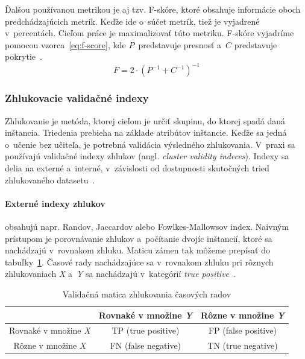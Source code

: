 \documentclass[a4paper,twoside,slovak,12pt,appendix]{article}
\begin{document}
Ďalšou používanou metrikou je aj tzv. F-skóre, ktoré obsahuje informácie oboch
predchádzajúcich metrík. Keďže ide o~súčet metrík, tiež je vyjadrené
v~percentách. Cieľom práce je maximalizovať túto metriku. F-skóre vyjadríme
pomocou vzorca~\ref{eq:f-score}, kde $P$~predstavuje presnosť a~$C$ predstavuje
pokrytie~\cite{Trevizan2015}.
\begin{equation}
	\label{eq:f-score}
  F = 2 \cdot \left( P^{-1} + C^{-1} \right)^{-1}
\end{equation}

\subsubsection{Zhlukovacie validačné indexy}
\label{c:cluster-validity-indeces}
Zhlukovanie je metóda, ktorej cieľom je určiť skupinu, do ktorej spadá daná
inštancia. Triedenia prebieha na základe atribútov inštancie. Keďže sa jedná
o~učenie bez učiteľa, je potrebná validácia výsledného zhlukovania. V~praxi sa
používajú validačné indexy zhlukov (angl. \textit{cluster validity indeces}).
Indexy sa delia na externé a~interné, v~závislosti od dostupnosti skutočných
tried zhlukovaného datasetu~\cite{Arbelaitz2013}.

\paragraph{Externé indexy zhlukov} obsahujú napr. Randov, Jaccardov alebo
Fowlkes-Mallowsov index. Naivným prístupom je porovnávanie zhlukov a~počítanie
dvojíc inštancií, ktoré sa nachádzajú v~rovnakom zhluku. Maticu zámen tak
môžeme prepísať do tabuľky~\ref{tab:validation-matrix}. Časové rady nachádzajúce
sa v~rovnakom zhluku pri rôznych zhlukovaniach \textit{X} a~\textit{Y} sa
nachádzajú v~kategórií \textit{true positive}~\cite{Bilgic2018}.

\begin{table}[htbp]
	\centering
	\caption{Validačná matica zhlukovania časových radov}
	\label{tab:validation-matrix}
	\begin{tabular}{|c|c|c|}
		\hline
		 																		&  Rovnaké v množine \textit{Y}   &  Rôzne v množine \textit{Y}   \\ \hline
		Rovnaké v množine \textit{X}  			&  TP (true positive)   					&  FP (false positive)  				\\ \hline
		Rôzne v množine \textit{X}  				&  FN (false negative)  					&  TN (true negative)   				\\ \hline
	\end{tabular}
\end{table}
\end{document}
